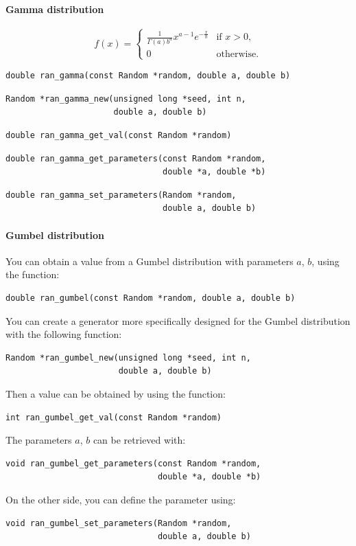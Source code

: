 
\paragraph{Gamma distribution}

\[
f(x) =
\begin{cases}
\frac{1}{\Gamma(a) b^a} x^{a-1} e^{-\frac{x}{b}} & \text{if } x > 0, \\
0 & \text{otherwise}.
\end{cases}
\]

\begin{verbatim}
double ran_gamma(const Random *random, double a, double b)
\end{verbatim}
\begin{verbatim}
Random *ran_gamma_new(unsigned long *seed, int n,
                      double a, double b)
\end{verbatim}
\begin{verbatim}
double ran_gamma_get_val(const Random *random)
\end{verbatim}
\begin{verbatim}
double ran_gamma_get_parameters(const Random *random,
                                double *a, double *b)
\end{verbatim}
\begin{verbatim}
double ran_gamma_set_parameters(Random *random,
                                double a, double b)
\end{verbatim}


\paragraph{Gumbel distribution}

You can obtain a value from a Gumbel distribution with
parameters $a$, $b$, using the function:
\begin{verbatim}
double ran_gumbel(const Random *random, double a, double b)
\end{verbatim}

You can create a generator more specifically designed for the
Gumbel distribution with the following function:
\begin{verbatim}
Random *ran_gumbel_new(unsigned long *seed, int n,
                       double a, double b)
\end{verbatim}
Then a value can be obtained by using the function:
\begin{verbatim}
int ran_gumbel_get_val(const Random *random)
\end{verbatim}
The parameters $a$, $b$ can be retrieved with:
\begin{verbatim}
void ran_gumbel_get_parameters(const Random *random,
                               double *a, double *b)
\end{verbatim}
On the other side, you can define the parameter using:
\begin{verbatim}
void ran_gumbel_set_parameters(Random *random,
                               double a, double b)
\end{verbatim}

